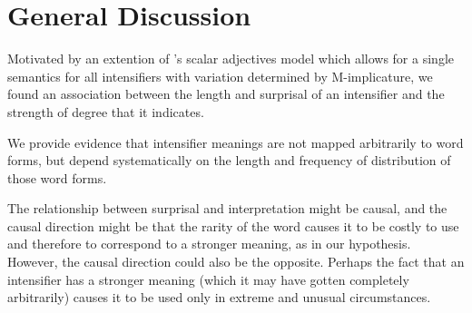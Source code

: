 \documentclass[10pt,letterpaper]{article}
\newcommand{\w}[1]{\emph{#1}}
\begin{document}
\section{General Discussion}

Motivated by an extention of 's scalar adjectives model which allows for a single semantics for all intensifiers with variation determined by M-implicature, we found an association between the length and surprisal of an intensifier and the strength of degree that it indicates.

We provide evidence that intensifier meanings are not mapped arbitrarily to word forms, but depend systematically on the length and frequency of distribution of those word forms.

%

The relationship between surprisal and interpretation might be causal, and the causal direction might be that the rarity of the word causes it to be costly to use and therefore to correspond to a stronger meaning, as in our hypothesis.
However, the causal direction could also be the opposite.
Perhaps the fact that an intensifier has a stronger meaning (which it may have gotten completely arbitrarily) causes it to be used only in extreme and unusual circumstances.
\end{document}
